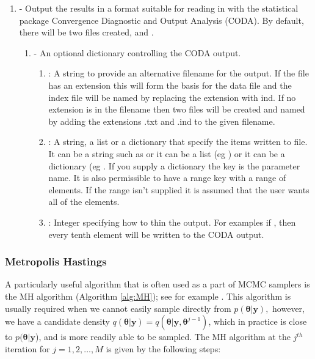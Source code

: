 \documentclass[article]{jss}
\begin{document}
\begin{enumerate}
  \item {} - Output the results in a
    format suitable for reading in with the statistical package
    Convergence Diagnostic and Output Analysis (CODA). By default,
    there will be two files created,  and
    .

    \begin{enumerate}
    \item {} - An optional dictionary controlling the
      CODA output.

      \begin{enumerate}
      \item {}: A string to provide an alternative
        filename for the output.  If the file has an extension this
        will form the basis for the data file and the index file will
        be named by replacing the extension with ind. If no extension
        is in the filename then two files will be created and named by
        adding the extensions .txt and .ind to the given filename.
      \item {}: A string, a list or a dictionary that
        specify the items written to file. It can be a string such as
         or it can be a list (eg
        ) or it can be a dictionary (eg
        .  If you supply a
        dictionary the key is the parameter name. It is also
        permissible to have a range key with a range of elements. If
        the range isn't supplied it is assumed that the user wants all
        of the elements.
      \item {}: Integer specifying how to thin the output.
        For examples if , then every tenth element
        will be written to the CODA output.
      \end{enumerate}
    \end{enumerate}
\end{enumerate}

\subsubsection{Metropolis Hastings}
\label{sub:Metropolis-Hastings}

A particularly useful algorithm that is often used as a part of MCMC
samplers is the MH algorithm (Algorithm \ref{alg:MH}); see for example
\citet{RobertCassela1999}. This algorithm is usually required when we
cannot easily sample directly from $p(\bm{\theta}|\bm{y}),$ however,
we have a candidate density
$q(\bm{\theta}|\bm{y})=q(\bm{\theta}|\bm{y},\bm{\theta}^{j-1})$, which
in practice is close to $p(\bm{\theta}|\bm{y}$), and is more readily
able to be sampled. The MH algorithm at the $j^{th}$ iteration for
$j=1,2,\dots,M$ is given by the following steps:
\end{document}
